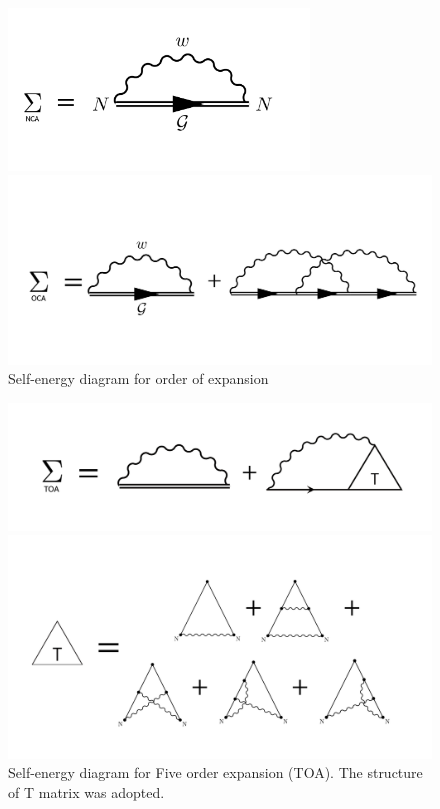 \documentclass{article}[12pt]
\numberwithin{equation}{section}
\begin{document}
\begin{spacing}{1.5}
\begin{figure}[H]
  \centerline{\includegraphics[width=8cm]{TexFigure/NCA_self.PNG}}
  \centerline{\includegraphics[width=12cm]{TexFigure/OCA_self.PNG}}
  \caption{Self-energy diagram for order of expansion}
\end{figure}
\begin{figure}[H]
  \centerline{\includegraphics[width=12cm]{TexFigure/TOA_se.png}}
  \centerline{\includegraphics[width=12cm]{TexFigure/TOA_tmat.png}}
  \caption{Self-energy diagram for Five order expansion (TOA). The structure of T matrix was adopted.}
\end{figure}

\end{spacing}
\end{document}
